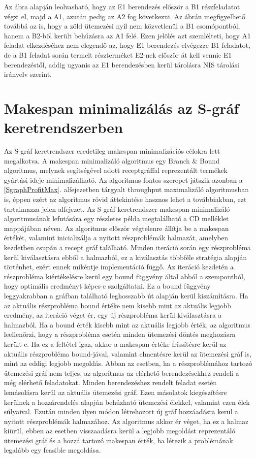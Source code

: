 Az ábra alapján leolvasható, hogy az E1 berendezés először a B1 részfeladatot végzi el, majd a A1, azután pedig az A2 fog következni.
Az ábrán megfigyelhető továbbá az is, hogy a zöld ütemezési nyíl nem közvetlenül a B1 csomópontból, hanem a B2-ből került behúzásra az A1 felé.
Ezen jelölés azt szemlélteti, hogy A1 feladat elkezdéséhez nem elegendő az, hogy E1 berendezés elvégezze B1 feladatot, de a B1 feladat során termelt részterméket E2-nek először át kell vennie E1 berendezéstől, addig ugyanis az E1 berendezésben kerül tárolásra NIS tárolási irányelv szerint.

\section{Makespan minimalizálás az S-gráf keretrendszerben}
Az S-gráf keretrendszer eredetileg makespan minimalizációs célokra lett megalkotva.
A makespan minimalizáló algoritmus egy Branch \& Bound algoritmus, melynek segítségével adott receptgráffal reprezentált termékek gyártási ideje minimalizálható.
Az algoritmus fontos szerepet játszik azonban a \ref{SgraphProfitMax}. alfejezetben tárgyalt throughput maximalizáló algoritmusban is, éppen ezért az algoritmus rövid áttekintése hasznos lehet a továbbiakban, ezt tartalmazza jelen alfejezet.
Az S-gráf keretrendszer makespan minimalizáló algoritmusának lefutására egy részletes példa megtalálható a CD melléklet  mappájában  néven. 
Az algoritmus először végtelenre állítja be a makespan értékét, valamint inicializálja a nyitott részproblémák halmazát, amelyben kezdetben csupán a recept gráf található.
Minden iteráció során egy részprobléma kerül kiválasztásra ebből a halmazból, ez a kiválasztás többféle stratégia alapján történhet, ezért ennek mikéntje implementáció függő.
Az iteráció kezdetén a  részprobléma kiértékelésre kerül egy bound függvény által abból a szempontból, hogy optimális eredményt képes-e szolgáltatni.
Ez a bound függvény leggyakrabban a gráfban található leghosszabb út alapján kerül kiszámításra.
Ha az aktuális részprobléma bound értéke nem kisebb mint az aktuális legjobb eredmény, az iteráció véget ér, egy új részprobléma kerül kiválasztásra a halmazból.
Ha a bound érték kisebb mint az aktuális legjobb érték, az algoritmus leellenőrzi, hogy a részprobléma esetén minden ütemezési döntés meghozásra került-e.
Ha ez a feltétel igaz, akkor a makespan értéke frissítésre kerül az aktuális részprobléma bound-jával, valamint elmentésre kerül az ütemezési gráf is, mint az eddigi legjobb megoldás.
Abban az esetben, ha a részproblémához tartozó ütemezési gráf nem teljes, az algoritmus az elérhető berendezésekhez rendeli a még elérhető feladatokat.
Minden berendezéshez rendelt feladat esetén lemásolásra kerül az aktuális ütemezési gráf.
Ezen másolatok kiegészítésre kerülnek a hozzárendelés alapján behúzható ütemezési élekkel, valamint ezen élek súlyaival.
Ezután minden ilyen módon létrehozott új gráf hozzáadásra kerül a nyitott részproblémák halmazához.
Az algoritmus akkor ér véget, ha ez a halmaz kiürül, ebben az esetben visszaadásra kerül a legjobb megoldást reprezentáló ütemezési gráf és a hozzá tartozó makespan érték, ha létezik a problémának legalább egy feasible megoldása. 

